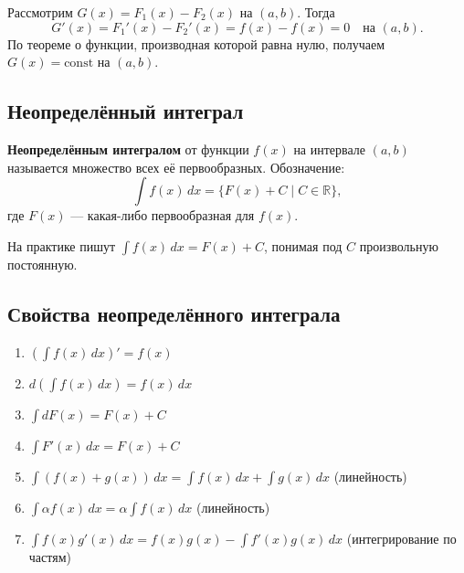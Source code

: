 \begin{Proof}
    Рассмотрим \(G(x) = F_1(x) - F_2(x)\) на \((a, b)\). Тогда
    \[
    G'(x) = F_1'(x) - F_2'(x) = f(x) - f(x) = 0 \quad \text{на } (a, b).
    \]
    По теореме о функции, производная которой равна нулю, получаем \(G(x) = \text{const}\) на \((a, b)\).
\end{Proof}

\subsection{Неопределённый интеграл}

\begin{definition}
    \textbf{Неопределённым интегралом} от функции \(f(x)\) на интервале \((a, b)\) называется множество всех её первообразных.
    Обозначение:
    \[
    \int f(x) \, dx = \{ F(x) + C \mid C \in \mathbb{R} \},
    \]
    где \(F(x)\) — какая-либо первообразная для \(f(x)\).
    
    На практике пишут \(\int f(x) \, dx = F(x) + C\), понимая под \(C\) произвольную постоянную.
\end{definition}

\subsection{Свойства неопределённого интеграла}

\begin{theorem}
    \begin{enumerate}
        \item \(\displaystyle \left( \int f(x) \, dx \right)' = f(x)\)
        \item \(\displaystyle d\left( \int f(x) \, dx \right) = f(x) \, dx\)
        \item \(\displaystyle \int dF(x) = F(x) + C\)
        \item \(\displaystyle \int F'(x) \, dx = F(x) + C\)
        \item \(\displaystyle \int (f(x) + g(x)) \, dx = \int f(x) \, dx + \int g(x) \, dx\) \quad (линейность)
        \item \(\displaystyle \int \alpha f(x) \, dx = \alpha \int f(x) \, dx\) \quad (линейность)
        \item \(\displaystyle \int f(x)g'(x) \, dx = f(x)g(x) - \int f'(x)g(x) \, dx\) \quad (интегрирование по частям)
    \end{enumerate}
\end{theorem}

